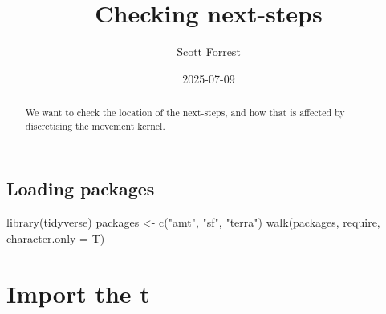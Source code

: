 \documentclass[
  letterpaper,
  DIV=11,
  numbers=noendperiod]{scrartcl}
\title{Checking next-steps}
\author{Scott Forrest}
\date{2025-07-09}
\newenvironment{Shaded}{\begin{snugshade}}{\end{snugshade}}
\newcommand{\AttributeTok}[1]{\textcolor[rgb]{0.40,0.45,0.13}{#1}}
\newcommand{\FunctionTok}[1]{\textcolor[rgb]{0.28,0.35,0.67}{#1}}
\newcommand{\NormalTok}[1]{\textcolor[rgb]{0.00,0.23,0.31}{#1}}
\newcommand{\OtherTok}[1]{\textcolor[rgb]{0.00,0.23,0.31}{#1}}
\newcommand{\StringTok}[1]{\textcolor[rgb]{0.13,0.47,0.30}{#1}}
\renewcommand*\contentsname{Table of contents}
\newcommand\contentsname{Table of contents}
\begin{document}
\maketitle
\begin{abstract}
We want to check the location of the next-steps, and how that is
affected by discretising the movement kernel.
\end{abstract}

\renewcommand*\contentsname{Table of contents}
{
\setcounter{tocdepth}{3}
\tableofcontents
}

\subsection{Loading packages}\label{loading-packages}

\begin{Shaded}
\begin{Highlighting}[]
\FunctionTok{library}\NormalTok{(tidyverse)}
\NormalTok{packages }\OtherTok{\textless{}{-}} \FunctionTok{c}\NormalTok{(}\StringTok{"amt"}\NormalTok{, }\StringTok{"sf"}\NormalTok{, }\StringTok{"terra"}\NormalTok{)}
\FunctionTok{walk}\NormalTok{(packages, require, }\AttributeTok{character.only =}\NormalTok{ T)}
\end{Highlighting}
\end{Shaded}

\section{Import the t}\label{import-the-t}
\end{document}
